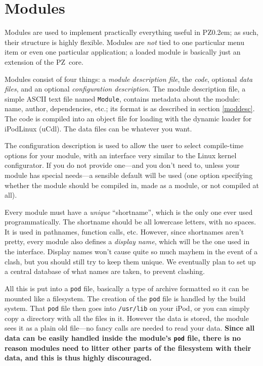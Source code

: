 \documentclass[12pt,letterpaper]{report}
\def\pz{{\footnotesize PZ}}
\def\pzt{\pz\kern0.2em{\large\oldstyle2}}
\begin{document}
\section{Modules}
Modules are used to implement practically everything useful in \pzt; as such, their structure
is highly flexible. Modules are {\it not} tied to one particular menu item or even one particular
application; a loaded module is basically just an extension of the \pz\ core.

Modules consist of four things: a {\sl module description file}, the {\sl code}, optional {\sl data
files}, and an optional {\sl configuration description}. The module description file,
a simple ASCII text file named \verb|Module|, contains
metadata about the module: name, author, dependencies, etc.; its format is as described in
section \ref{moddesc}. The code is compiled into an object file for loading with the dynamic
loader for iPodLinux (uCdl).
The data files can be whatever you want.

The configuration description is used to allow the user to select compile-time options for your
module, with an interface very similar to the Linux kernel configurator. If you do not provide
one---and you don't need to, unless your module has special needs---a sensible default will be
used (one option specifying whether the module should be compiled in, made as a module, or
not compiled at all).

Every module must have a {\it unique} ``shortname'', which is the only one ever used programmatically.
The shortname should be all lowercase letters, with no spaces. It is used in pathnames,
function calls, etc. However, since shortnames aren't pretty, every module also defines a
{\sl display name}, which will be the one used in the interface. Display names won't cause quite
so much mayhem in the event of a clash, but you should still try to keep them unique. We eventually
plan to set up a central database of what names are taken, to prevent clashing.

All this is put into a \verb|pod| file, basically a type of archive formatted so it can be
mounted like a filesystem. The creation of the \verb|pod| file is handled by the build system.
That \verb|pod| file then goes into \verb|/usr/lib| on your iPod, or you can simply copy a directory
with all the files in it.
However the data is stored, the module sees it as a plain old file---no fancy calls are needed
to read your data. {\bf Since all data can be easily handled inside the module's \verb|pod| file, there
is no reason modules need to litter other parts of the filesystem with their data, and this
is thus highly discouraged.}
\end{document}
